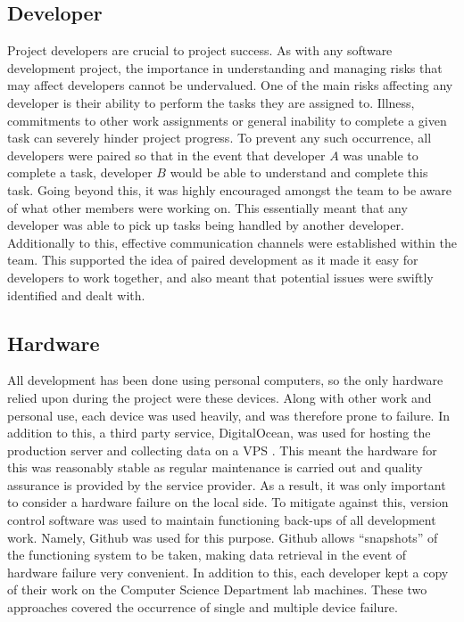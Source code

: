 \subsection{Developer}
Project developers are crucial to project success. As with any software development project, the importance in understanding and managing risks that may affect developers cannot be undervalued. One of the main risks affecting any developer is their ability to perform the tasks they are assigned to. Illness, commitments to other work assignments or general inability to complete a given task can severely hinder project progress. To prevent any such occurrence, all developers were paired so that in the event that developer $A$ was unable to complete a task, developer $B$ would be able to understand and complete this task. Going beyond this, it was highly encouraged amongst the team to be aware of what other members were working on. This essentially meant that any developer was able to pick up tasks being handled by another developer. Additionally to this, effective communication channels were established within the team. This supported the idea of paired development as it made it easy for developers to work together, and also meant that potential issues were swiftly identified and dealt with.

\subsection{Hardware}
All development has been done using personal computers, so the only hardware relied upon during the project were these devices. Along with other work and personal use, each device was used heavily, and was therefore prone to failure. In addition to this, a third party service, DigitalOcean, was used for hosting the production server and collecting data on a VPS \cite{DigitalOcean:Home}. This meant the hardware for this was reasonably stable as regular maintenance is carried out and quality assurance is provided by the service provider. As a result, it was only important to consider a hardware failure on the local side. To mitigate against this, version control software was used to maintain functioning back-ups of all development work. Namely, Github was used for this purpose. Github allows ``snapshots'' of the functioning system to be taken, making data retrieval in the event of hardware failure very convenient. In addition to this, each developer kept a copy of their work on the Computer Science Department lab machines. These two approaches covered the occurrence of single and multiple device failure.

